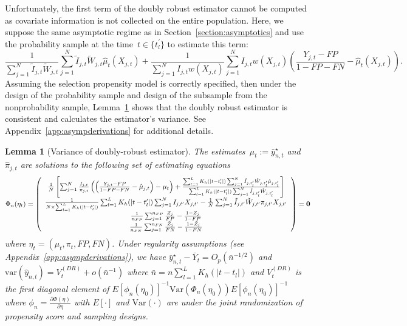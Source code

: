 \documentclass[11pt]{amsart}
\numberwithin{equation}{section}
\theoremstyle{plain}
\newtheorem{lemma}[theorem]{Lemma}
\begin{document}
 Unfortunately, the first term of the doubly robust estimator cannot be computed as covariate information is not collected on the entire population.  Here, we suppose the same asymptotic regime as in Section~\ref{section:asymptotics} and use the probability sample at the time~$t \in \{t_l^\prime\}$ to estimate this term:
 $$
 \frac{1}{\sum_{j=1}^N \tilde I_{j,t} \tilde W_{j,t}} \sum_{j=1}^N  \tilde I_{j,t} \tilde W_{j,t} \hat \mu_{t} (X_{j,t}) + \frac{1}{\sum_{j=1}^N I_{j,t} w (X_{j,t})} \sum_{j=1}^N I_{j,t} w(X_{j,t}) \left( \frac{Y_{j,t} - FP}{1 - FP - FN} - \hat \mu_t(X_{j,t}) \right).
 $$
 Assuming the selection propensity model is correctly specified, then under the design of the probability sample and design of the subsample from the nonprobability sample, Lemma~\ref{lemma:dr} shows that the doubly robust estimator is consistent and calculates the estimator's variance. See Appendix~\ref{app:asympderivations} for additional details.

 \begin{lemma}[Variance of doubly-robust estimator] \normalfont
 \label{lemma:dr}
 The estimates~$\mu_t := \bar y_{n,t}^\star$ and $\hat \pi_{j,t}$
 are solutions to the following set of estimating equations
 $$
 \Phi_n (\eta_t) =
 \left (
 \begin{array}{c}
 \frac{1}{N} \left[ \sum_{j=1}^N \frac{I_{j,t}}{\pi_{j,t}} \left( \left( \frac{Y_{j,t} - FP}{1-FP-FN} - \hat \mu_{j,t}  \right)  - \mu_t \right) + \frac{\sum_{l=1}^L K_{h} (|t - t_l^\prime|) \sum_{j=1}^N \tilde I_{j,t_l^\prime} \tilde W_{j,t_l^\prime} \hat \mu_{j,t_l^\prime}}{\sum_{l=1}^L K_{h} (|t - t_l^\prime|) \sum_{j=1}^N \tilde I_{j,t_l^\prime} \tilde W_{j,t_l^\prime}} \right] \\
 \frac{1}{N \times \sum_{l=1}^L K_{h} (|t - t_l^\prime|)} \sum_{l=1}^L K_{h} (|t - t_l^\prime|) \sum_{j=1}^N I_{j,t^\prime} X_{j,t^\prime} - \frac{1}{N} \sum_{j = 1}^N \tilde I_{j,t^\prime} \tilde W_{j,t^\prime}  \pi_{j,t^\prime} X_{j,t^\prime}  \\
 \frac{1}{n_{FP}} \sum_{j=1}^{n_{FP}} \frac{Z_j}{FP} - \frac{1-Z_j}{1-FP} \\
 \frac{1}{n_{FN}} \sum_{j=1}^{n_{FN}} \frac{\tilde Z_j}{FN} - \frac{1-\tilde Z_j}{1-FN} \\
 \end{array}
 \right ) = {\bf 0}
 $$
 where $\eta_t = (\mu_t, \pi_t, FP, FN)$. Under regularity assumptions (see Appendix~\ref{app:asympderivations}), we have $\bar y_{n,t}^\star - \bar Y_{t} = O_p (\bar n^{-1/2})$ and $\text{var} (\hat y_{n,t}) = V_{t}^{(DR)} + o (\bar n^{-1})$ where $\bar n = n \sum_{l=1}^L K_h(|t-t_l|)$ and $V_t^{(DR)}$ is the first diagonal element of $E [\phi_n(\eta_0)]^{-1} \text{Var}(\Phi_n(\eta_0))E [\phi_n(\eta_0)]^{-1}$ where $\phi_n = \frac{\partial \Phi (\eta)}{\partial \eta}$ with $E[\cdot]$ and $\text{Var} (\cdot)$ are under the joint randomization of propensity score and sampling designs.
 \end{lemma}
\end{document}
